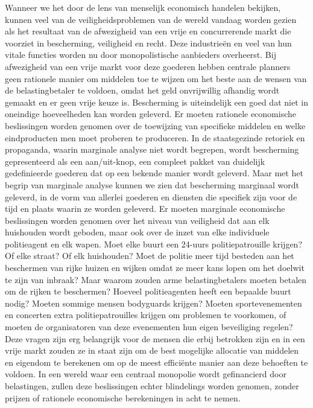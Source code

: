 Wanneer we het door de lens van menselijk economisch handelen bekijken, kunnen veel van de veiligheidsproblemen van de wereld vandaag worden gezien als het resultaat van de afwezigheid van een vrije en concurrerende markt die voorziet in bescherming, veiligheid en recht. Deze industrieën en veel van hun vitale functies worden nu door monopolistische aanbieders overheerst. Bij afwezigheid van een vrije markt voor deze goederen hebben centrale planners geen rationele manier om middelen toe te wijzen om het beste aan de wensen van de belastingbetaler te voldoen, omdat het geld onvrijwillig afhandig wordt gemaakt en er geen vrije keuze is. Bescherming is uiteindelijk een goed dat niet in oneindige hoeveelheden kan worden geleverd. Er moeten rationele economische beslissingen worden genomen over de toewijzing van specifieke middelen en welke eindproducten men moet proberen te produceren. In de staatsgezinde retoriek en propaganda, waarin marginale analyse niet wordt begrepen, wordt bescherming gepresenteerd als een aan/uit-knop, een compleet pakket van duidelijk gedefinieerde goederen dat op een bekende manier wordt geleverd. Maar met het begrip van marginale analyse kunnen we zien dat bescherming marginaal wordt geleverd, in de vorm van allerlei goederen en diensten die specifiek zijn voor de tijd en plaats waarin ze worden geleverd. Er moeten marginale economische beslissingen worden genomen over het niveau van veiligheid dat aan elk huishouden wordt geboden, maar ook over de inzet van elke individuele politieagent en elk wapen. Moet elke buurt een 24-uurs politiepatrouille krijgen? Of elke straat? Of elk huishouden? Moet de politie meer tijd besteden aan het beschermen van rijke huizen en wijken omdat ze meer kans lopen om het doelwit te zijn van inbraak? Maar waarom zouden arme belastingbetalers moeten betalen om de rijken te beschermen? Hoeveel politieagenten heeft een bepaalde buurt nodig? Moeten sommige mensen bodyguards krijgen? Moeten sportevenementen en concerten extra politiepatrouilles krijgen om problemen te voorkomen, of moeten de organisatoren van deze evenementen hun eigen beveiliging regelen? Deze vragen zijn erg belangrijk voor de mensen die erbij betrokken zijn en in een vrije markt zouden ze in staat zijn om de best mogelijke allocatie van middelen en eigendom te berekenen om op de meest efficiënte manier aan deze behoeften te voldoen. In een wereld waar een centraal monopolie wordt gefinancierd door belastingen, zullen deze beslissingen echter blindelings worden genomen, zonder prijzen of rationele economische berekeningen in acht te nemen.

